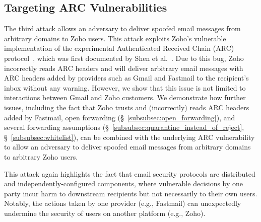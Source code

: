 \subsection{Targeting ARC Vulnerabilities}
\label{subsec:attack_zoho_arc}
The third attack allows an adversary to deliver spoofed email messages
from arbitrary domains to Zoho users.  This attack exploits Zoho's
vulnerable implementation of the experimental Authenticated Received
Chain (ARC) protocol~\cite{ARCSpeci1:online}, which was first
documented by Shen et al.~\cite{shen2020weak}. Due to this bug, Zoho
incorrectly reads ARC headers and will deliver arbitrary email
messages with ARC headers added by providers such as Gmail and
Fastmail to the recipient's inbox without any warning.  However, we
show that this issue is not limited to interactions between Gmail and
Zoho customers.  We demonstrate how further issues, including the fact that
Zoho trusts and (incorrectly) reads ARC headers added by Fastmail, open forwarding
(\S~\ref{subsubsec:open_forwarding}), and several forwarding
assumptions (\S~\ref{subsubsec:quarantine_instead_of_reject},
\S~\ref{subsubsec:whitelist}), can be combined with the underlying ARC
vulnerability to allow an adversary to deliver spoofed email messages
from arbitrary domains to arbitrary Zoho users.

This attack again highlights the fact that email security protocols
are distributed and independently-configured components, where
vulnerable decisions by one party incur harm to downstream recipients
but not necessarily to their own users.  Notably, the actions taken
by one provider (e.g., Fastmail) can unexpectedly undermine the
security of users on another platform (e.g., Zoho).



